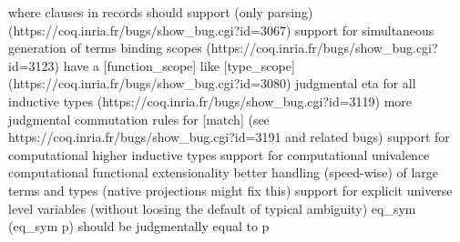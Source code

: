 \documentclass{beamer}
\begin{document}
\begin{frame}
where clauses in records should support (only parsing) (https://coq.inria.fr/bugs/show\_bug.cgi?id=3067)
support for simultaneous generation of terms binding scopes (https://coq.inria.fr/bugs/show\_bug.cgi?id=3123)
have a [function\_scope] like [type\_scope] (https://coq.inria.fr/bugs/show\_bug.cgi?id=3080)
judgmental eta for all inductive types (https://coq.inria.fr/bugs/show\_bug.cgi?id=3119)
more judgmental commutation rules for [match] (see https://coq.inria.fr/bugs/show\_bug.cgi?id=3191 and related bugs)
support for computational higher inductive types
support for computational univalence
computational functional extensionality
better handling (speed-wise) of large terms and types (native projections might fix this)
support for explicit universe level variables (without loosing the default of typical ambiguity)
eq\_sym (eq\_sym p) should be judgmentally equal to p


\end{frame}
\end{document}
